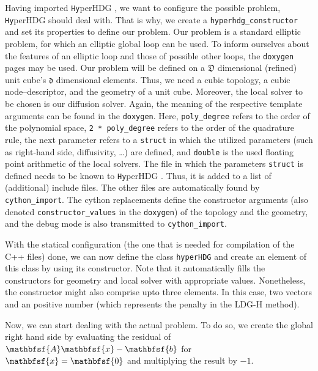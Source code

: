 \documentclass[a4paper, english, 12pt, reqno, draft]{amsart}
\theoremstyle{definition}
\theoremstyle{remark}
\numberwithin{equation}{section}
\newcommand{\hyperHDG}{{\fontfamily{pzc}\selectfont \texttt{Hy}\hspace{-1.5pt}perHDG }}
\newcommand{\locDim}{\ensuremath{\mathfrak d}}
\newcommand{\globDim}{\ensuremath{\mathfrak D}}
\newcommand{\vecc}[1]{\ensuremath{\mathbfsf{#1}}}
\newcommand{\code}[1]{\texttt{#1}}
\begin{document}
Having imported \hyperHDG, we want to configure the possible problem, \hyperHDG should deal with. That is why, we create a \code{hyperhdg\_\-constructor} and set its properties to define our problem. Our problem is a standard elliptic problem, for which an elliptic global loop can be used. To inform ourselves about the features of an elliptic loop and those of possible other loops, the \code{doxygen} pages may be used. Our problem will be defined on a $\globDim$ dimensional (refined) unit cube's $\locDim$ dimensional elements. Thus, we need a cubic topology, a cubic node--descriptor, and the geometry of a unit cube. Moreover, the local solver to be chosen is our diffusion solver. Again, the meaning of the respective template arguments can be found in the \code{doxygen}. Here, \code{poly\_degree} refers to the order of the polynomial space, \code{2 * poly\_degree} refers to the order of the quadrature rule, the next parameter refers to a \code{struct} in which the utilized parameters (such as right-hand side, diffusivity, \ldots) are defined, and \code{double} is the used floating point arithmetic of the local solvers. The file in which the parameters \code{struct} is defined needs to be known to \hyperHDG. Thus, it is added to a list of (additional) include files. The other files are automatically found by \code{cython\_import}. The cython replacements define the constructor arguments (also denoted \code{constructor\_values} in the \code{doxygen}) of the topology and the geometry, and the debug mode is also transmitted to \code{cython\_import}.
%

%
With the statical configuration (the one that is needed for compilation of the C++ files) done, we can now define the class \code{hyperHDG} and create an element of this class by using its constructor. Note that it automatically fills the constructors for geometry and local solver with appropriate values. Nonetheless, the constructor might also comprise upto three elements. In this case, two vectors and an positive number (which represents the penalty in the LDG-H method). 
%

%
Now, we can start dealing with the actual problem. To do so, we create the global right hand side by evaluating the residual of $\vecc A \vecc x - \vecc b$ for $\vecc x = \vecc 0$ and multiplying the result by $-1$.
%

\end{document}
